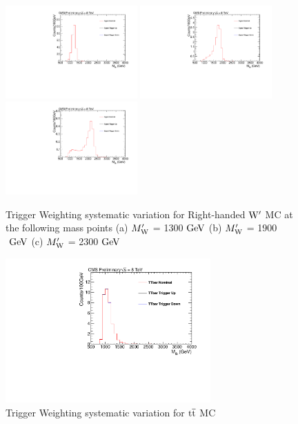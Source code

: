\begin{figure}[htcb]
\begin{center}
\includegraphics[width=0.45\textwidth]{AN-13-004/figs/Signal_M1300_TriggerWeighting}
\includegraphics[width=0.45\textwidth]{AN-13-004/figs/Signal_M1900_TriggerWeighting}
\includegraphics[width=0.45\textwidth]{AN-13-004/figs/Signal_M2300_TriggerWeighting}
\caption{
Trigger Weighting systematic variation for Right-handed $\mathrm{W}^\prime$ MC at the following mass points
(a) $M_\mathrm{W}^\prime$ = 1300$~\mathrm{GeV}$ 
(b) $M_\mathrm{W}^\prime$ = 1900$~\mathrm{GeV}$
(c) $M_\mathrm{W}^\prime$ = 2300$~\mathrm{GeV}$ 
}
\label{figs:signaltrig}
\end{center}
\end{figure}

\begin{figure}[htcb]
\begin{center}
\includegraphics[width=0.7\textwidth]{AN-13-004/figs/TTbar_TriggerWeighting}
\caption{Trigger Weighting systematic variation for $\mathrm{t\overline{t}}$ MC}
\label{figs:ttbartrig}
\end{center}
\end{figure}


